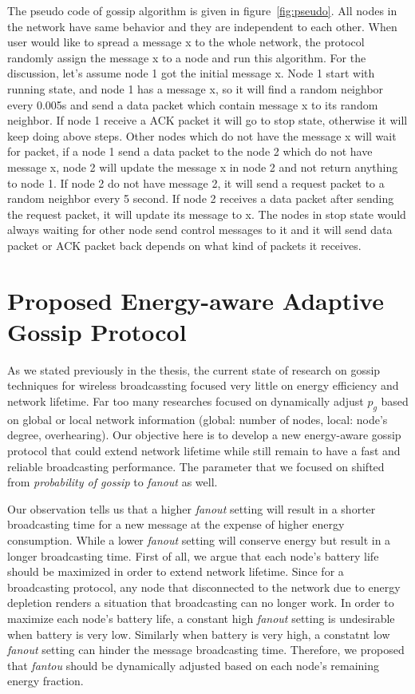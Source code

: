 The pseudo code of gossip algorithm is given in figure~\ref{fig:pseudo}. All nodes in the network have same behavior and they are independent to each other. When user would like to spread a message x to the whole network, the protocol randomly assign the message x to a node and run this algorithm. For the discussion, let's assume node 1 got the initial message x. Node 1 start with running state, and node 1 has a message x, so it will find a random neighbor every 0.005s and send a data packet which contain message x to its random neighbor. If node 1 receive a ACK packet it will go to stop state, otherwise it will keep doing above steps. Other nodes which do not have the message x will wait for packet, if a node 1 send a data packet to the node 2 which do not have message x, node 2 will update the message x in node 2 and not return anything to node 1. If node 2 do not have message 2, it will send a request packet to a random neighbor every 5 second. If node 2 receives a data packet after sending the request packet, it will update its message to x. The nodes in stop state would always waiting for other node send control messages to it and it will send data packet or ACK packet back depends on what kind of packets it receives.

\section{Proposed Energy-aware Adaptive Gossip Protocol}
As we stated previously in the thesis, the current state of research on gossip techniques for wireless broadcassting focused very little on energy efficiency and network lifetime. Far too many researches focused on dynamically adjust $p_g$ based on global or local network information (global: number of nodes, local: node's degree, overhearing). Our objective here is to develop a new energy-aware gossip protocol that could extend network lifetime while still remain to have a fast and reliable broadcasting performance. The parameter that we focused on shifted from \emph{probability of gossip} to \emph{fanout} as well. 

Our observation tells us that a higher \emph{fanout} setting will result in a shorter broadcasting time for a new message at the expense of higher energy consumption. While a lower \emph{fanout} setting will conserve energy but result in a longer broadcasting time. First of all, we argue that each node's battery life should be maximized in order to extend network lifetime. Since for a broadcasting protocol, any node that disconnected to the network due to energy depletion renders a situation that broadcasting can no longer work. In order to maximize each node's battery life, a constant high \emph{fanout} setting is undesirable when battery is very low. Similarly when battery is very high, a constatnt low \emph{fanout} setting can hinder the message broadcasting time. Therefore, we proposed that \emph{fantou} should be dynamically adjusted based on each node's remaining energy fraction. 

